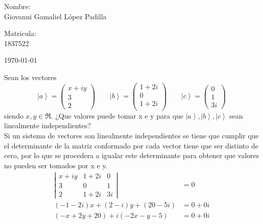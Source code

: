 \documentclass[12pt,letterpaper]{report}
\begin{document}
\begin{titlepage}
\begin{center}
\begin{minipage}{0.6\linewidth}
\changefontsizes{14pt}
Nombre:\\                                                                                                                                                                                                                                                           
Giovanni Gamaliel López Padilla\\
\end{minipage}
\begin{minipage}{0.2\linewidth}
\changefontsizes{14pt} 
Matricula:\\                                                                                                                        
1837522
\end{minipage}
\end{center}
\vspace{4cm}
\begin{flushright}
\today
\end{flushright}
\end{titlepage}
Sean los vectores 
\begin{equation*}
\left|a \right\rangle = \left(\begin{matrix}
        x+iy \\ 3 \\ 2 
    \end{matrix} \right)
    \qquad \left|b \right\rangle =\left(\begin{matrix}
        1+2i \\ 0\\ 1+2i \\ 
    \end{matrix} \right) \qquad 
    \left|c \right\rangle = \left(\begin{matrix}
        0 \\ 1 \\ 3i
    \end{matrix} \right)
\end{equation*}
siendo $x,y \in \Re$. ¿Que valores puede tomar x e y para que $\left|a \right\rangle, \left|b \right\rangle,\left|c \right\rangle$ sean linealmente independientes?\\
Si un sistema de vectores son linealmente independientes se tiene que cumplir que el determinante de la matriz conformado por cada vector tiene que ser distinto de cero, por lo que 
se procedera a igualar este determinante para obtener que valores no pueden ser tomados por x e y.
\begin{align*}
    \left|\begin{matrix}
        x+iy & 1+2i & 0\\ 
        3 & 0 & 1 \\ 
        2 & 1+2i & 3i 
    \end{matrix} \right| & = 0 \\
    (-1-2i)x+(2-i)y+(20-5i)&=0+0i\\
    (-x+2y+20) + i( -2x-y-5)&=0+0i\\
\end{align*}
\end{document}

